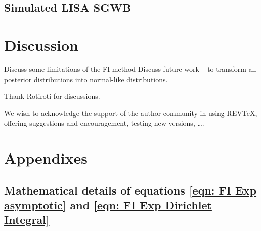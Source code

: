 \documentclass[%
 reprint,
 amsmath,amssymb,
 aps,
]{revtex4-2}
\begin{document}
\subsection{\label{subsec:LISA} Simulated LISA SGWB}




\section{\label{sec:discussion} Discussion}
Discuss some limitations of the FI method
Discuss future work -- to transform all posterior distributions into normal-like distributions.




\begin{acknowledgments}
Thank Rotiroti for discussions.

We wish to acknowledge the support of the author community in using
REV\TeX{}, offering suggestions and encouragement, testing new versions,
\dots.
\end{acknowledgments}

\appendix
\section{Appendixes}

\subsection{Mathematical details of equations \eqref{eqn: FI Exp asymptotic} and \eqref{eqn: FI Exp Dirichlet Integral}}
\label{subsec: maths details of the FI Exp example}
\end{document}
